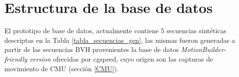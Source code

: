 \section{Estructura de la base de datos}

El prototipo de base de datos, actualmente contiene 5 secuencias sintéticas descriptas en la Tabla \ref{tabla_secuencias_gen}, las mismas fueron generadas a partir de las secuencias BVH provenientes la 
base de datos \textit{MotionBuilder-friendly version} ofrecidas por cgspeed\cite{cgspeed}, cuyo origen son las capturas de movimiento de CMU (sección \ref{CMU}). 





